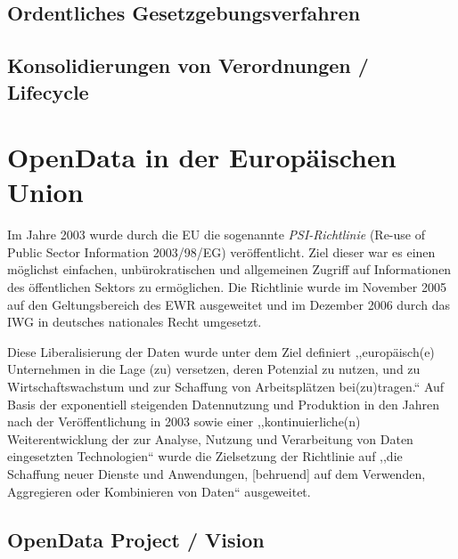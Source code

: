     
            \pagebreak    
        \subsection{Ordentliches Gesetzgebungsverfahren}
            \pagebreak    
        
        \subsection{Konsolidierungen von Verordnungen / Lifecycle}
            \pagebreak    
        

    \section{OpenData in der Europäischen Union}

Im Jahre 2003 wurde durch die EU die sogenannte \textit{PSI-Richtlinie} (Re-use of Public Sector Information 2003/98/EG) veröffentlicht.
Ziel dieser war es einen möglichst einfachen, unbürokratischen und allgemeinen Zugriff auf Informationen des öffentlichen Sektors zu ermöglichen.
Die Richtlinie wurde im November 2005 auf den Geltungsbereich des EWR ausgeweitet\cite{2005D0105} und im Dezember 2006 durch das \ac{IWG} in deutsches nationales Recht umgesetzt.

Diese Liberalisierung der Daten wurde unter dem Ziel definiert ,,europäisch(e) Unternehmen in die Lage (zu) versetzen, deren Potenzial zu nutzen, und zu Wirtschaftswachstum und zur Schaffung von Arbeitsplätzen bei(zu)tragen.``\cite[ErwG. 5]{2003L0098} 
Auf Basis der exponentiell steigenden Datennutzung und Produktion in den Jahren nach der Veröffentlichung in 2003 sowie einer ,,kontinuierliche(n) Weiterentwicklung der zur Analyse, Nutzung und Verarbeitung von Daten eingesetzten Technologien``\cite[ErwG. 5]{2013L0037} wurde die Zielsetzung der Richtlinie auf ,,die Schaffung neuer Dienste und Anwendungen, [behruend] auf dem Verwenden, Aggregieren oder Kombinieren von Daten``\cite[ErwG. 5]{2013L0037} ausgeweitet. 

        
        \subsection{OpenData Project / Vision}

